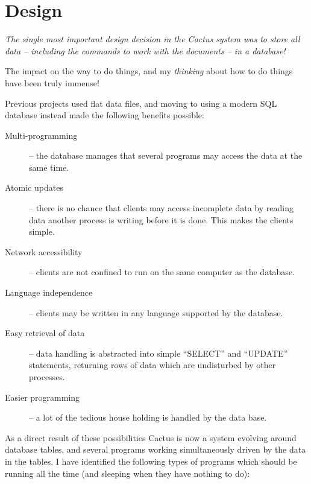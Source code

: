 \section{Design}
\label{sec:cactus-design}

\textit{The single most important design decision in the Cactus system
was to store all data -- including the commands to work with the
documents -- in a database!}

The impact on the way to do things, and my \textit{thinking} about how
to do things have been truly immense!

Previous projects used flat data files, and moving to using a modern
SQL database instead made the following benefits
possible:

\begin{description}
\item[Multi-programming] -- the database manages that several programs
  may access the data at the same time.
\item[Atomic updates] --  there is no chance that clients may access
  incomplete data by reading data another process is writing before it
  is done.  This makes the clients simple.
\item[Network accessibility] -- clients are not confined to run on the
  same computer as the database.
\item[Language independence] -- clients may be written in any language
  supported by the database.
\item[Easy retrieval of data] -- data handling is abstracted into
   simple ``SELECT'' and ``UPDATE'' statements, returning rows of data
   which are undisturbed by other processes.

\item[Easier programming] -- a lot of the tedious house holding is
handled by the data base.

\end{description}

As a direct result of these possibilities Cactus is now a system
evolving around database tables, and several programs working
simultaneously driven by the data in the tables.  I have identified
the following types of programs which should be running all the time
(and sleeping when they have nothing to do):

